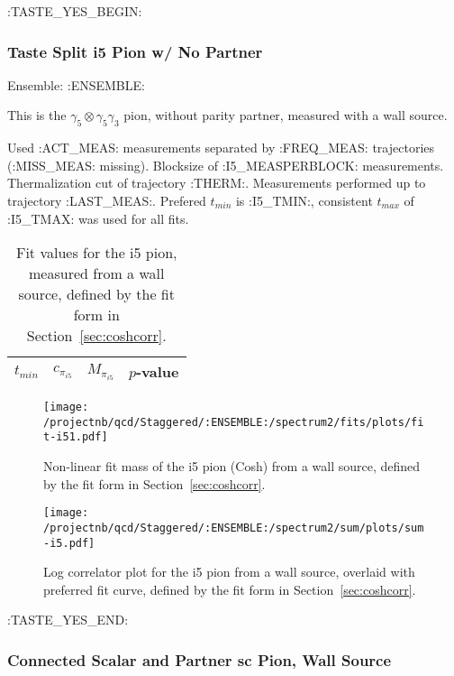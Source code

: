 \clearpage

:TASTE_YES_BEGIN:
\subsubsection{Taste Split i5 Pion w/ No Partner}

Ensemble: :ENSEMBLE:

This is the $\gamma_5 \otimes \gamma_5 \gamma_3$ pion, without parity partner, measured with a wall source. 

{\small{Used :ACT_MEAS: measurements separated by :FREQ_MEAS: trajectories (:MISS_MEAS: missing). Blocksize of :I5_MEASPERBLOCK: measurements. Thermalization cut of trajectory :THERM:. Measurements performed up to trajectory :LAST_MEAS:. Prefered $t_{min}$ is :I5_TMIN:, consistent $t_{max}$ of :I5_TMAX: was used for all fits.}}

\begin{table}[ht!]
\centering
\scriptsize
\begin{tabular}{|c|c|c|c|}
\hline
 $t_{min}$ & $c_{\pi_{i5}}$ &  $M_{\pi_{i5}}$ & $p$-value \\
\hline

\end{tabular}
\caption{Fit values for the i5 pion, measured from a wall source, defined by the fit form in Section~\ref{sec:coshcorr}.}
\end{table}


\begin{figure}[H]
\centering
\texttt{[image: /projectnb/qcd/Staggered/:ENSEMBLE:/spectrum2/fits/plots/fit-i51.pdf]}
\caption{Non-linear fit mass of the i5 pion (Cosh) from a wall source, defined by the fit form in Section~\ref{sec:coshcorr}.}
\end{figure}

\begin{figure}[H]
\centering
\texttt{[image: /projectnb/qcd/Staggered/:ENSEMBLE:/spectrum2/sum/plots/sum-i5.pdf]}
\caption{Log correlator plot for the i5 pion from a wall source, overlaid with preferred fit curve, defined by the fit form in Section~\ref{sec:coshcorr}.}
\end{figure}

\clearpage
:TASTE_YES_END:

\subsubsection{Connected Scalar and Partner sc Pion, Wall Source}

